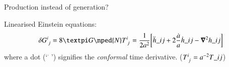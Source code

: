 





\begin{bullets}
    \item Production instead of generation?
\end{bullets}


Linearised Einstein equations: 
\begin{equation}
    \delta G\indices{^{i}_{j}} = 8\ppi G\nped{N} T\indices{^{i}_{j}}= \frac{1}{2a^2} \bclosed{ \ddot{h}\_{ij} + 2\frac{\dot{a}}{a} \dot{h}\_{ij} - \bnabla^2 h\_{ij} } 
\end{equation}
where a dot (`$\dot{\phantom{a}}$') signifies the \emph{conformal} time derivative. ($T\indices{^{i}_{j}} = a^{-2} T\_{ij}$) \blahblah

    
    
    

